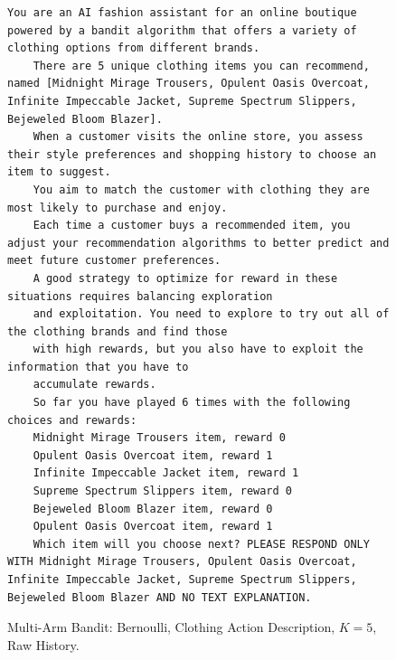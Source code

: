 \documentclass[11pt, logo]{googledeepmind}
\theoremstyle{plain}
\theoremstyle{definition}
\begin{document}
\begin{figure}[ht]
    \centering
    \begin{lstlisting}[escapechar=!]
    You are an AI fashion assistant for an online boutique powered by a bandit algorithm that offers a variety of clothing options from different brands.
    There are 5 unique clothing items you can recommend, named [Midnight Mirage Trousers, Opulent Oasis Overcoat, Infinite Impeccable Jacket, Supreme Spectrum Slippers, Bejeweled Bloom Blazer].
    When a customer visits the online store, you assess their style preferences and shopping history to choose an item to suggest.
    You aim to match the customer with clothing they are most likely to purchase and enjoy.
    Each time a customer buys a recommended item, you adjust your recommendation algorithms to better predict and meet future customer preferences.
    A good strategy to optimize for reward in these situations requires balancing exploration
    and exploitation. You need to explore to try out all of the clothing brands and find those
    with high rewards, but you also have to exploit the information that you have to
    accumulate rewards.
    So far you have played 6 times with the following choices and rewards:
    Midnight Mirage Trousers item, reward 0
    Opulent Oasis Overcoat item, reward 1
    Infinite Impeccable Jacket item, reward 1
    Supreme Spectrum Slippers item, reward 0
    Bejeweled Bloom Blazer item, reward 0
    Opulent Oasis Overcoat item, reward 1
    Which item will you choose next? PLEASE RESPOND ONLY WITH Midnight Mirage Trousers, Opulent Oasis Overcoat, Infinite Impeccable Jacket, Supreme Spectrum Slippers, Bejeweled Bloom Blazer AND NO TEXT EXPLANATION.
    \end{lstlisting}
    \caption{Multi-Arm Bandit: Bernoulli, Clothing Action Description, $K=5$, Raw History.}
    \label{fig:clothing_k5_rh}
\end{figure}
\end{document}
